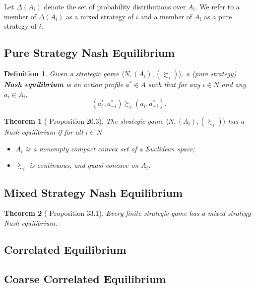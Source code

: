 \documentclass[openany]{book}
\newtheorem{definition}{Definition}[chapter]
\newtheorem{theorem}{Theorem}[chapter]
\theoremstyle{remark}
\begin{document}
Let $\Delta(A_i)$ denote the set of probability distributions over $A_i$. We refer to a member of $\Delta(A_i)$ as a mixed strategy of $i$ and a member of $A_i$ as a pure strategy of $i$.

\subsection{Pure Strategy Nash Equilibrium}
\begin{definition}
Given a strategic game $\langle N,(A_i),(\succsim_i)\rangle$, a (pure strategy) \textbf{Nash equilibrium} is an action profile $a^*\in A$ such that for any $i\in N$ and any $a_i\in A_i$,
\begin{equation}
    (a_i^*,a_{-i}^*)\succsim_i(a_i,a_{-i}^*).
\end{equation}
\end{definition}

\begin{theorem}[\cite{OR94} Proposition 20.3]
The strategic game $\langle N,(A_i),(\succsim_i)\rangle$ has a Nash equilibrium if for all $i\in N$
\begin{itemize}
\item $A_i$ is a nonempty compact convex set of a Euclidean space;
\item $\succsim_i$ is continuous, and quasi-concave on $A_i$.
\end{itemize}
\end{theorem}

\subsection{Mixed Strategy Nash Equilibrium}
\begin{theorem}[\cite{OR94} Proposition 33.1]
Every finite strategic game has a mixed strategy Nash equilibrium.
\end{theorem}

\subsection{Correlated Equilibrium}

\subsection{Coarse Correlated Equilibrium}
\end{document}
